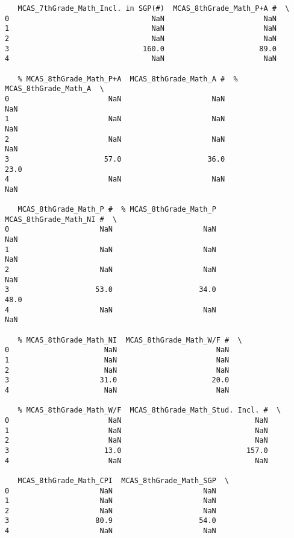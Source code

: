 \documentclass[11pt]{article}
\begin{document}
\begin{verbatim}
   MCAS_7thGrade_Math_Incl. in SGP(#)  MCAS_8thGrade_Math_P+A #  \
0                                 NaN                       NaN   
1                                 NaN                       NaN   
2                                 NaN                       NaN   
3                               160.0                      89.0   
4                                 NaN                       NaN   

   % MCAS_8thGrade_Math_P+A  MCAS_8thGrade_Math_A #  % MCAS_8thGrade_Math_A  \
0                       NaN                     NaN                     NaN   
1                       NaN                     NaN                     NaN   
2                       NaN                     NaN                     NaN   
3                      57.0                    36.0                    23.0   
4                       NaN                     NaN                     NaN   

   MCAS_8thGrade_Math_P #  % MCAS_8thGrade_Math_P  MCAS_8thGrade_Math_NI #  \
0                     NaN                     NaN                      NaN   
1                     NaN                     NaN                      NaN   
2                     NaN                     NaN                      NaN   
3                    53.0                    34.0                     48.0   
4                     NaN                     NaN                      NaN   

   % MCAS_8thGrade_Math_NI  MCAS_8thGrade_Math_W/F #  \
0                      NaN                       NaN   
1                      NaN                       NaN   
2                      NaN                       NaN   
3                     31.0                      20.0   
4                      NaN                       NaN   

   % MCAS_8thGrade_Math_W/F  MCAS_8thGrade_Math_Stud. Incl. #  \
0                       NaN                               NaN   
1                       NaN                               NaN   
2                       NaN                               NaN   
3                      13.0                             157.0   
4                       NaN                               NaN   

   MCAS_8thGrade_Math_CPI  MCAS_8thGrade_Math_SGP  \
0                     NaN                     NaN   
1                     NaN                     NaN   
2                     NaN                     NaN   
3                    80.9                    54.0   
4                     NaN                     NaN   


\end{verbatim}
\end{document}
